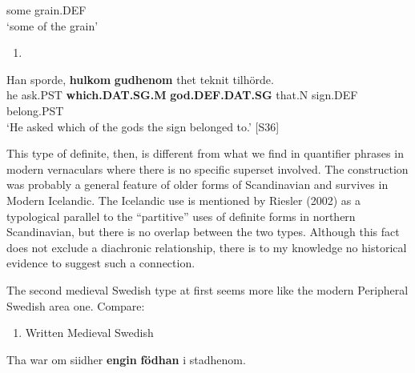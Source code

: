 some  grain.DEF\\ %


‘some of the grain’
\z


\begin{enumerate} %
\item 
\end{enumerate} %
\ea\label{}
\gll Han  sporde,  \textbf{hulkom} \textbf{gudhenom} thet  teknit  tilhörde.\\


he  ask.PST  \textbf{which.DAT.SG.M} \textbf{god.DEF.DAT.SG} that.N  sign.DEF  belong.PST\\ %


‘He asked which of the gods the sign belonged to.’ [S36]
\z

This type of definite, then, is different from what we find in quantifier phrases in modern vernaculars where there is no specific superset involved. The construction was probably a general feature of older forms of Scandinavian and survives in Modern Icelandic. The Icelandic use is mentioned by Riesler (2002) as a typological parallel to the “partitive” uses of definite forms in northern Scandinavian, but there is no overlap between the two types. Although this fact does not exclude a diachronic relationship, there is to my knowledge no historical evidence to suggest such a connection.

The second medieval Swedish type at first seems more like the modern Peripheral Swedish area one. Compare:

\begin{enumerate} %
\item 
\label{bkm:Ref78603361}Written Medieval Swedish

\end{enumerate} %
\ea\label{}
\gll Tha  war  om siidher  \textbf{engin} \textbf{födhan} i  stadhenom.\\


